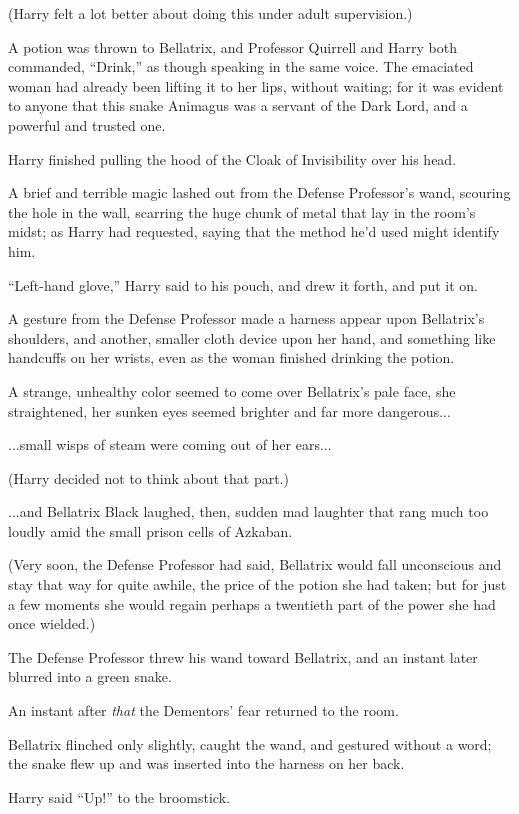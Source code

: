 (Harry felt a lot better about doing this under adult supervision.)

A potion was thrown to Bellatrix, and Professor Quirrell and Harry both
commanded, ``Drink,'' as though speaking in the same voice. The
emaciated woman had already been lifting it to her lips, without
waiting; for it was evident to anyone that this snake Animagus was a
servant of the Dark Lord, and a powerful and trusted one.

Harry finished pulling the hood of the Cloak of Invisibility over his
head.

A brief and terrible magic lashed out from the Defense Professor's wand,
scouring the hole in the wall, scarring the huge chunk of metal that lay
in the room's midst; as Harry had requested, saying that the method he'd
used might identify him.

``Left-hand glove,'' Harry said to his pouch, and drew it forth, and put
it on.

A gesture from the Defense Professor made a harness appear upon
Bellatrix's shoulders, and another, smaller cloth device upon her hand,
and something like handcuffs on her wrists, even as the woman finished
drinking the potion.

A strange, unhealthy color seemed to come over Bellatrix's pale face,
she straightened, her sunken eyes seemed brighter and far more
dangerous...

...small wisps of steam were coming out of her ears...

(Harry decided not to think about that part.)

...and Bellatrix Black laughed, then, sudden mad laughter that rang
much too loudly amid the small prison cells of Azkaban.

(Very soon, the Defense Professor had said, Bellatrix would fall
unconscious and stay that way for quite awhile, the price of the potion
she had taken; but for just a few moments she would regain perhaps a
twentieth part of the power she had once wielded.)

The Defense Professor threw his wand toward Bellatrix, and an instant
later blurred into a green snake.

An instant after \emph{that} the Dementors' fear returned to the room.

Bellatrix flinched only slightly, caught the wand, and gestured without
a word; the snake flew up and was inserted into the harness on her back.

Harry said ``Up!'' to the broomstick.

